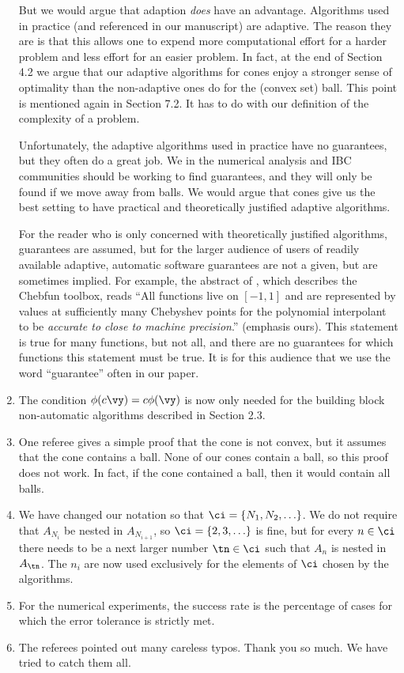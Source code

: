 \documentclass[11pt]{article}
\begin{document}
\begin{enumerate}
But we would argue that adaption \emph{does} have an advantage.  Algorithms used in practice (and referenced in our manuscript) are adaptive.  The reason they are is that this allows one to expend more computational effort for a harder problem and less effort for an easier problem.  In fact, at the end of Section 4.2 we argue that our adaptive algorithms for cones enjoy a stronger sense of optimality than the non-adaptive ones do for the (convex set) ball. This point is mentioned again in Section 7.2.  It has to do with our definition of the complexity of a problem. 

Unfortunately, the adaptive algorithms used in practice have no guarantees, but they often do a great job.  We in the numerical analysis and IBC communities should be working to find guarantees, and they will only be found if we move away from balls.  We would argue that cones give us the best setting to have practical and theoretically justified adaptive algorithms.  

For the reader who is only concerned with theoretically justified algorithms, guarantees are assumed, but for the larger audience of users of readily available adaptive, automatic software guarantees are not a given, but are sometimes implied.  For example, the abstract of \cite{BatTre04a}, which describes the Chebfun toolbox, reads ``All functions live on $[-1,1]$ and are represented by values at sufficiently many Chebyshev points for the polynomial interpolant to be \emph{accurate to close to machine precision}.''  (emphasis ours).  This statement is true for many functions, but not all, and there are no guarantees for which functions this statement must be true.  It is for this audience that we use the word ``guarantee'' often in our paper.

\item The condition $\phi(c\vy) = c\phi(\vy)$ is now only needed for the building block non-automatic algorithms described in Section 2.3.

\item One referee gives a simple proof that the cone is not convex, but it assumes that the cone contains a ball.  None of our cones contain a ball, so this proof does not work.  In fact, if the cone contained a ball, then it would contain all balls.

\item We have changed our notation so that $\ci=\{N_1, N_2, \ldots \}$.  We do not require that $A_{N_i}$ be nested in $A_{N_{i+1}}$, so $\ci=\{2,3, \ldots\}$ is fine, but for every $n \in \ci$ there needs to be a next larger number $\tn \in \ci$ such that $A_n$ is nested in $A_{\tn}$.  The $n_i$ are now used exclusively for the elements of $\ci$ chosen by the algorithms.

\item For the numerical experiments, the success rate is the percentage of cases for which the error tolerance is strictly met.  

\item The referees pointed out many careless typos.  Thank you so much.  We have tried to catch them all.

\end{enumerate}
\end{document}
